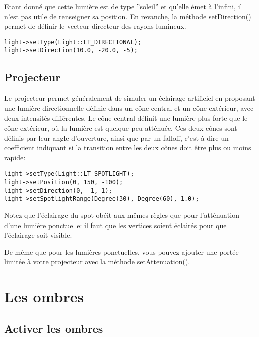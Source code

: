 \documentclass[10pt,a4paper]{report}
\begin{document}
Etant donn\'e que cette lumi\`ere est de type ''soleil'' et qu'elle \'emet \`{a} l'infini, il n'est pas utile de renseigner sa position. En revanche, la m\'ethode setDirection() permet de d\'efinir le vecteur directeur des rayons lumineux.

\begin{lstlisting}
light->setType(Light::LT_DIRECTIONAL);
light->setDirection(10.0, -20.0, -5);
\end{lstlisting}






\subsection{Projecteur}

Le projecteur permet g\'en\'eralement de simuler un \'eclairage artificiel en proposant une lumi\`ere directionnelle d\'efinie dans un c\^one central et un c\^one ext\'erieur, avec deux intensit\'es diff\'erentes. Le c\^one central d\'efinit une lumi\`ere plus forte que le c\^one ext\'erieur, o\`{u} la lumi\`ere est quelque peu att\'enu\'ee. Ces deux c\^ones sont d\'efinis par leur angle d'ouverture, ainsi que par un falloff, c'est-\`{a}-dire un coefficient indiquant si la transition entre les deux c\^ones doit \^etre plus ou moins rapide:
\begin{lstlisting}
light->setType(Light::LT_SPOTLIGHT);
light->setPosition(0, 150, -100);
light->setDirection(0, -1, 1);
light->setSpotlightRange(Degree(30), Degree(60), 1.0);
\end{lstlisting}


Notez que l'\'eclairage du spot ob\'eit aux m\^emes r\`egles que pour l'att\'enuation d'une lumi\`ere ponctuelle: il faut que les vertices soient \'eclair\'es pour que l'\'eclairage soit visible.


De m\^eme que pour les lumi\`eres ponctuelles, vous pouvez ajouter une port\'ee limit\'ee \`{a} votre projecteur avec la m\'ethode setAttenuation().






\section{Les ombres}


\subsection{Activer les ombres}
\end{document}
